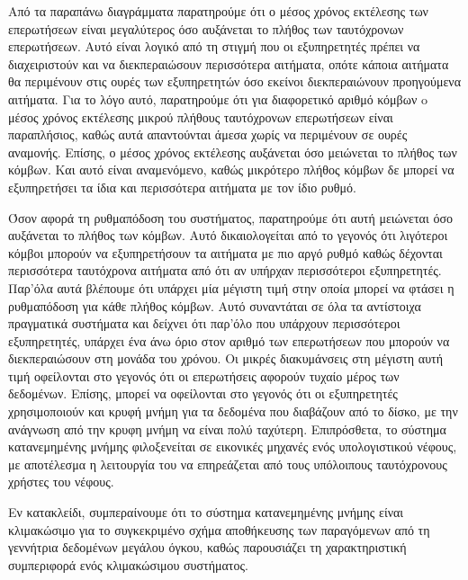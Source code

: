 Από τα παραπάνω διαγράμματα παρατηρούμε ότι ο μέσος χρόνος εκτέλεσης των επερωτήσεων είναι μεγαλύτερος όσο αυξάνεται το 
πλήθος των ταυτόχρονων επερωτήσεων. Αυτό είναι λογικό από τη στιγμή που οι εξυπηρετητές πρέπει να διαχειριστούν και να διεκπεραιώσουν περισσότερα αιτήματα, οπότε 
κάποια αιτήματα θα περιμένουν στις ουρές των εξυπηρετητών όσο εκείνοι \linebreak διεκπεραιώνουν προηγούμενα αιτήματα. Για το λόγο αυτό, 
παρατηρούμε ότι για διαφορετικό αριθμό κόμβων o μέσος χρόνος εκτέλεσης μικρού πλήθους ταυτόχρονων επερωτήσεων είναι παραπλήσιος, καθώς αυτά απαντούνται 
άμεσα χωρίς να περιμένουν σε ουρές αναμονής. 
Επίσης, ο μέσος χρόνος εκτέλεσης αυξάνεται όσο μειώνεται το πλήθος των κόμβων. Και αυτό είναι αναμενόμενο, καθώς μικρότερο πλήθος κόμβων δε μπορεί να εξυπηρετήσει τα ίδια και 
περισσότερα αιτήματα με τον ίδιο ρυθμό.

Όσον αφορά τη ρυθμαπόδοση του συστήματος, παρατηρούμε ότι αυτή μειώνεται όσο αυξάνεται το πλήθος των κόμβων. Αυτό δικαιολογείται από το γεγονός ότι λιγότεροι κόμβοι 
μπορούν να \linebreak εξυπηρετήσουν τα αιτήματα με πιο αργό ρυθμό καθώς δέχονται περισσότερα ταυτόχρονα αιτήματα από ότι αν υπήρχαν περισσότεροι εξυπηρετητές. Παρ'όλα αυτά βλέπουμε 
ότι υπάρχει μία μέγιστη τιμή στην οποία μπορεί να φτάσει η ρυθμαπόδοση για κάθε πλήθος κόμβων. Αυτό συναντάται σε όλα τα αντίστοιχα πραγματικά συστήματα και δείχνει ότι 
παρ'όλο που υπάρχουν περισσότεροι εξυπηρετητές, υπάρχει ένα άνω όριο στον αριθμό των επερωτήσεων που μπορούν να διεκπεραιώσουν στη μονάδα του χρόνου. Οι 
μικρές διακυμάνσεις στη μέγιστη αυτή τιμή οφείλονται στο γεγονός ότι οι επερωτήσεις αφορούν τυχαίο μέρος των δεδομένων. Επίσης, μπορεί να οφείλονται στο γεγονός ότι 
οι εξυπηρετητές χρησιμοποιούν και κρυφή μνήμη για τα δεδομένα που διαβάζουν από το δίσκο, με την ανάγνωση από την κρυφη μνήμη να είναι πολύ ταχύτερη. Επιπρόσθετα, 
το σύστημα κατανεμημένης μνήμης φιλοξενείται σε εικονικές μηχανές ενός υπολογιστικού νέφους, με αποτέλεσμα η λειτουργία του να επηρεάζεται από τους 
υπόλοιπους ταυτόχρονους χρήστες του νέφους. 

Εν κατακλείδι, συμπεραίνουμε ότι το σύστημα κατανεμημένης μνήμης είναι κλιμακώσιμο για το συγκεκριμένο σχήμα αποθήκευσης των παραγόμενων 
από τη γεννήτρια δεδομένων μεγάλου όγκου, καθώς παρουσιάζει τη χαρακτηριστική συμπεριφορά ενός κλιμακώσιμου συστήματος. 


